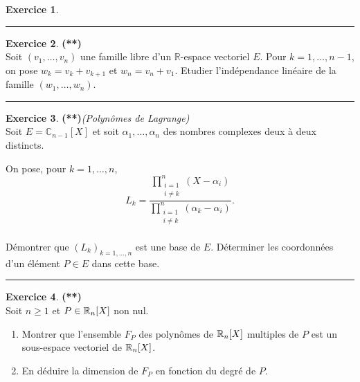 \documentclass[a4paper,11pt]{article}
\theoremstyle{definition}
\newtheorem{exo}{Exercice} %
\begin{document}
\begin{minipage}{1\linewidth}
\begin{minipage}[t]{0.48\linewidth}
\begin{exo}
			
		\centering\rule{1\linewidth}{0.6pt}\end{exo}
		
		
	\end{minipage}\hfill\vrule\hfill\begin{minipage}[t]{0.48\linewidth}\raggedright
		
		
		\begin{exo}\textbf{(**)}\quad\\[0.2cm]
		Soit $(v_1,\dots,v_n)$ une famille libre d'un $\mathbb R$-espace vectoriel $E$.
		Pour $k=1,\dots,n-1$, on pose $w_k=v_k+v_{k+1}$ et $w_n=v_n+v_1$. Etudier 
		l'indépendance linéaire de la famille $(w_1,\dots,w_n)$.
			
		\centering\rule{1\linewidth}{0.6pt}\end{exo}
		
		
	
		\begin{exo}\textbf{(**)}\quad \textit{(Polynômes de Lagrange)}\\[0.2cm]
		Soit $E=\mathbb C_{n-1}[X]$ et soit $\alpha_1,\dots,\alpha_n$ des nombres complexes deux à deux distincts. 
		
		On pose, pour $k=1,\dots,n$,\\[-0.4cm]
		$$L_k=\frac{\prod_{\substack{i=1\\i\neq k}}^n (X-\alpha_i)}{\prod_{\substack{i=1\\i\neq k}}^n (\alpha_k-\alpha_i)}.$$\quad\\[-0.2cm]
		
		\noindent Démontrer que $(L_k)_{k=1,\dots,n}$ est une base de $E$. Déterminer les coordonnées d'un élément $P\in E$ dans cette base.
		
		
		\centering\rule{1\linewidth}{0.6pt}\end{exo}



		\begin{exo}\textbf{(**)}\quad\\[0.2cm]
		Soit $n \geq 1$ et $P \in \mathbb{R}_n [X]$ non nul.
		\begin{enumerate}
			\item Montrer que l’ensemble $F_P$ des polynômes de $\mathbb{R}_n [X]$ multiples de $P$ est un sous-espace vectoriel de $\mathbb{R}_n [X]$.
			\item En déduire la dimension de $F_P$ en fonction du degré de $P $.
		\end{enumerate}
		

\end{exo}
\end{minipage}
\end{minipage}
\end{document}

